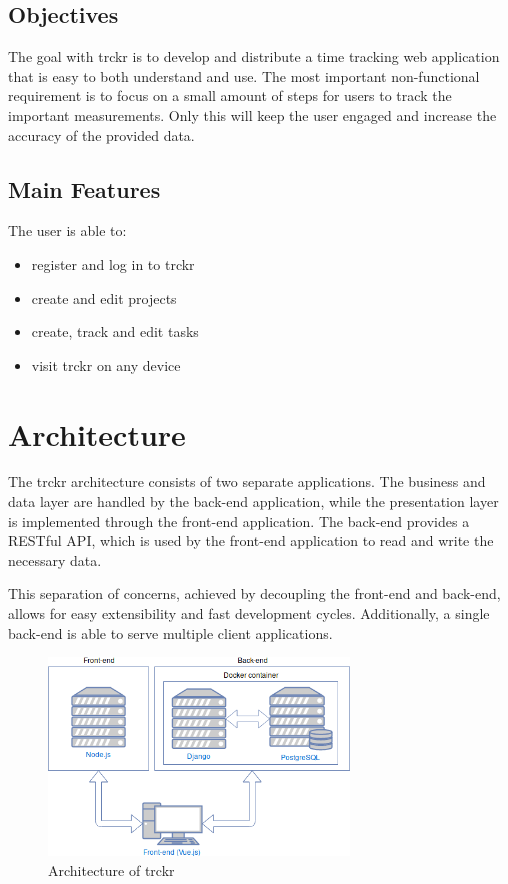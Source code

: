 \documentclass[bibliography=totoc, listof=totocnumbered]{scrartcl}
\begin{document}
\subsection{Objectives}
The goal with trckr is to develop and distribute a time tracking web application
that is easy to both understand and use. The most important non-functional
requirement is to focus on a small amount of steps for users to track the
important measurements. Only this will keep the user engaged and increase the
accuracy of the provided data.

\subsection{Main Features}
The user is able to:
\begin{itemize}
    \item register and log in to trckr
    \item create and edit projects
    \item create, track and edit tasks
    \item visit trckr on any device
\end{itemize}

\section{Architecture}
The trckr architecture consists of two separate applications. The business and
data layer are handled by the back-end application, while the presentation layer
is implemented through the front-end application. The back-end provides a
RESTful API, which is used by the front-end application to read and write the
necessary data.

This separation of concerns, achieved by decoupling the front-end and back-end,
allows for easy extensibility and fast development cycles. Additionally, a
single back-end is able to serve multiple client applications.

\begin{figure}[h]
    \includegraphics[width=8cm]{architecture}
    \caption{Architecture of trckr}
    \label{fig:architecture}
\end{figure}
\end{document}

